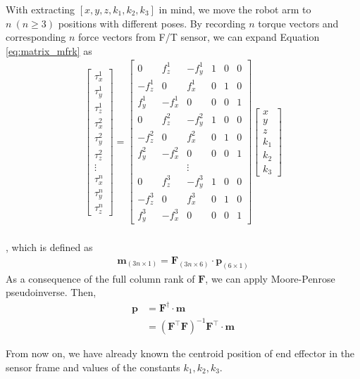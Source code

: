With extracting $[x,y,z,k_1,k_2,k_3]$ in mind, we move the robot arm to $n\ (n\geq3)$ positions with different poses. By recording $n$ torque vectors and corresponding $n$ force vectors from F/T sensor, we can expand Equation \ref{eq:matrix_mfrk} as
\begin{equation}
\begin{split}
\begin{bmatrix}
\tau _x^1	\\
\tau _y^1	\\
\tau _z^1	\\
\tau _x^2	\\
\tau _y^2	\\
\tau _z^2	\\
\vdots\\
\tau _x^n	\\
\tau _y^n	\\
\tau _z^n	
\end{bmatrix}
=
\begin{bmatrix}
0			&f_z^1		&-f_y^1		&1	&0	&0\\
-f_z^1		&0			&f_x^1		&0	&1	&0\\
f_y^1		&-f_x^1		&0			&0	&0	&1\\
0			&f_z^2		&-f_y^2		&1	&0	&0\\
-f_z^2		&0			&f_x^2		&0	&1	&0\\
f_y^2		&-f_x^2		&0			&0	&0	&1\\
 			& 			&\vdots		& 	& 	& \\
0			&f_z^3		&-f_y^3		&1	&0	&0\\
-f_z^3		&0			&f_x^3		&0	&1	&0\\
f_y^3		&-f_x^3		&0			&0	&0	&1
\end{bmatrix}
\begin{bmatrix}
x\\
y\\
z\\
k_1\\
k_2\\
k_3
\end{bmatrix}\\
\end{split}
\end{equation}
\par
, which is defined as 
\begin{equation}
\begin{split}
\boldsymbol{m}_{\left(3n \times 1\right)} = \mathbf{F}_{\left(3n \times 6\right)} \cdot \boldsymbol{p}_{\left(6 \times 1\right)}
\end{split}
\end{equation}
As a consequence of the full column rank of $\mathbf{F}$, we can apply Moore-Penrose pseudoinverse. Then, 
\begin{equation*}
\begin{split}
\boldsymbol{p} 	&= \mathbf{F}^{\dagger} \cdot \boldsymbol{m}\\
				&= \left( \mathbf{F}^\top\mathbf{F}\right) ^{-1}\mathbf{F}^\top \cdot \boldsymbol{m}
\end{split}
\end{equation*}
\par
From now on, we have already known the centroid position of end effector in the sensor frame and values of the constants $k_1,k_2,k_3$.
